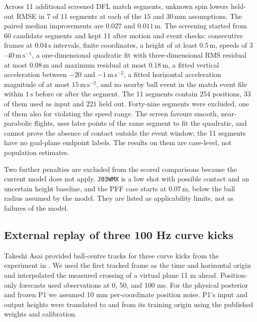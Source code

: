 \documentclass[11pt,a4paper]{article}
\begin{document}
Across 11 additional screened DFL match segments, unknown spin lowers held-out RMSE in 7 of 11 segments at each of the $15$ and $30\,\mathrm{mm}$ assumptions. The paired median improvements are $0.027$ and $0.011\,\mathrm{m}$. The screening started from 60 candidate segments and kept 11 after motion and event checks: consecutive frames at $0.04\,\mathrm{s}$ intervals, finite coordinates, a height of at least $0.5\,\mathrm{m}$, speeds of $3$--$40\,\mathrm{m\,s^{-1}}$, a one-dimensional quadratic fit with three-dimensional RMS residual at most $0.08\,\mathrm{m}$ and maximum residual at most $0.18\,\mathrm{m}$, a fitted vertical acceleration between $-20$ and $-1\,\mathrm{m\,s^{-2}}$, a fitted horizontal acceleration magnitude of at most $15\,\mathrm{m\,s^{-2}}$, and no nearby ball event in the match event file within $1\,\mathrm{s}$ before or after the segment. The 11 segments contain $254$ positions, $33$ of them used as input and $221$ held out. Forty-nine segments were excluded, one of them also for violating the speed range. The screen favours smooth, near-parabolic flights, uses later points of the same segment to fit the quadratic, and cannot prove the absence of contact outside the event window; the 11 segments have no goal-plane endpoint labels. The results on them are case-level, not population estimates.

Two further penalties are excluded from the scored comparisons because the current model does not apply. \texttt{J03WMX} is a low shot with possible contact and an uncertain height baseline, and the PFF case starts at $0.07\,\mathrm{m}$, below the ball radius assumed by the model. They are listed as applicability limits, not as failures of the model.

\subsection{External replay of three 100 Hz curve kicks}
\label{sec:asai-replay}
Takeshi Asai provided ball-centre tracks for three curve kicks from the experiment in \cite{asai2020replay}. We used the first tracked frame as the time and horizontal origin and interpolated the measured crossing of a virtual plane 11 m ahead. Position-only forecasts used observations at 0, 50, and 100 ms. For the physical posterior and frozen P1 we assumed 10 mm per-coordinate position noise. P1's input and output heights were translated to and from its training origin using the published weights and calibration.
\end{document}
